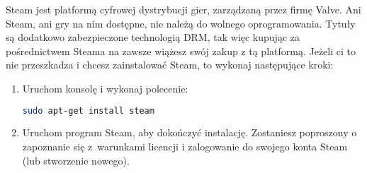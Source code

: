 Steam jest platformą cyfrowej dystrybucji gier, zarządzaną przez firmę Valve. Ani Steam, ani gry na nim dostępne, nie należą do wolnego oprogramowania. Tytuły są dodatkowo zabezpieczone technologią DRM, tak więc kupując za pośrednictwem Steama na zawsze wiążesz swój zakup z tą platformą. Jeżeli ci to nie przeszkadza i chcesz zainstalować Steam, to wykonaj następujące kroki:
\begin{enumerate}
\item Uruchom konsolę  i wykonaj polecenie:
\begin{lstlisting}[language=bash]
sudo apt-get install steam
\end{lstlisting}
\item Uruchom program Steam, aby dokończyć instalację. Zostaniesz poproszony o zapoznanie się z~warunkami licencji i zalogowanie do swojego konta Steam (lub stworzenie nowego).
\end{enumerate}
